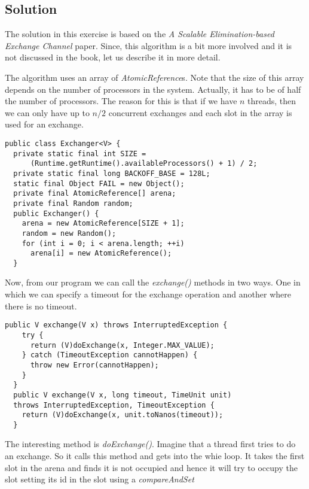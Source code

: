\subsection{Solution}
\par
The solution in this exercise is based on the \textit{A Scalable
Elimination-based Exchange Channel} paper. Since, this algorithm is a bit more
involved and it is not discussed in the book, let us describe it in more detail.
\par
The algorithm uses an array of \textit{AtomicReference}s. Note that the size of
this array depends on the number of processors in the system. Actually, it has
to be of half the number of processors. The reason for this is that if we have
$n$ threads, then we can only have up to $n/2$ concurrent exchanges and each
slot in the array is used for an exchange.
\par
\hfill
\begin{lstlisting}[style=numbers]
public class Exchanger<V> {
  private static final int SIZE =
      (Runtime.getRuntime().availableProcessors() + 1) / 2;
  private static final long BACKOFF_BASE = 128L;
  static final Object FAIL = new Object();
  private final AtomicReference[] arena;
  private final Random random;
  public Exchanger() {
    arena = new AtomicReference[SIZE + 1];
    random = new Random();
    for (int i = 0; i < arena.length; ++i)
      arena[i] = new AtomicReference();
  }
\end{lstlisting}
\hfill
\par
Now, from our program we can call the \textit{exchange()} methods in two ways.
One in which we can specify a timeout for the exchange operation and another
where there is no timeout.
\par
\hfill
\begin{lstlisting}[style=numbers]
  public V exchange(V x) throws InterruptedException {
    try {
      return (V)doExchange(x, Integer.MAX_VALUE);
    } catch (TimeoutException cannotHappen) {
      throw new Error(cannotHappen);
    }
  }
  public V exchange(V x, long timeout, TimeUnit unit)
  throws InterruptedException, TimeoutException {
    return (V)doExchange(x, unit.toNanos(timeout));
  }
\end{lstlisting}
\hfill
\par
The interesting method is \textit{doExchange()}. Imagine that a thread first
tries to do an exchange. So it calls this method and gets into the whie loop. It
takes the first slot in the arena and finds it is not occupied and hence it will
try to occupy the slot setting its id in the slot using a \textit{compareAndSet}
